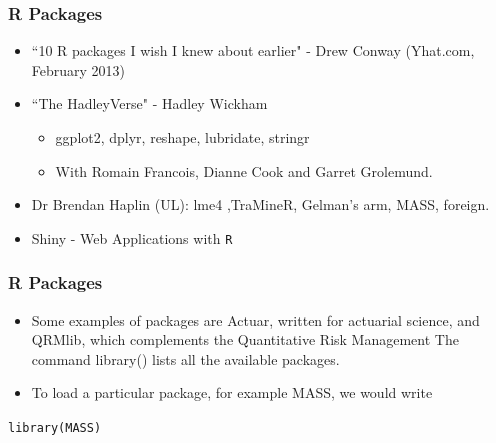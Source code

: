 \documentclass{beamer}
\begin{document}
 	
 	\begin{frame} 
 		\frametitle{R Packages}
 		
 		\begin{itemize}
 			\item ``10 R packages I wish I knew about earlier" - Drew Conway (Yhat.com, February 2013)
 			\bigskip \item ``The HadleyVerse" - Hadley Wickham
 			\begin{itemize}
 				
 				\item  ggplot2, dplyr, reshape, lubridate, stringr
 				
 				\item  With Romain Francois, Dianne Cook and Garret Grolemund.
 			\end{itemize}
 			\bigskip
 			\item Dr Brendan Haplin (UL): lme4 ,TraMineR, Gelman's arm, MASS, foreign. 
 			\bigskip
 			\item Shiny - Web Applications with \texttt{R}
 		\end{itemize}
 	\end{frame}
 	\begin{frame} 
 		\frametitle{R Packages}
 		
 		\begin{itemize}
 		\item  	
 		Some examples of packages are Actuar, written for actuarial science, and
 		QRMlib, which complements the Quantitative Risk Management The command library()
 		lists all the available packages. 
 		
 		\item To load a particular package, for example MASS, we would
 		write
 	\end{itemize}\begin{framed}
 		\texttt{library(MASS)}
 		\end{framed}
 	\end{frame}
\end{document}
